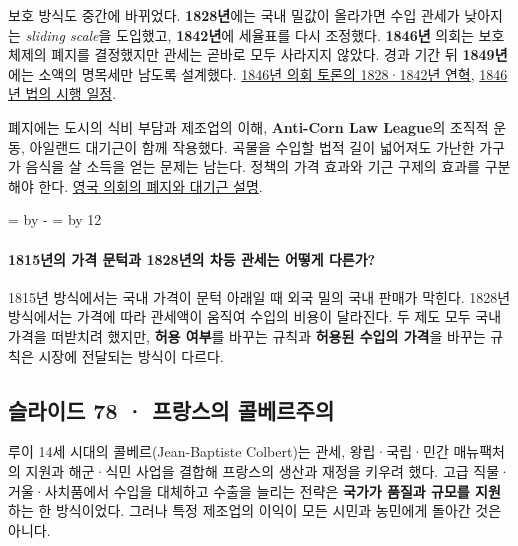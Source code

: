 \documentclass[10pt,a4paper]{article}
\newcommand{\ReserveQuestionSpace}{%
  \par\begingroup
  \dimen0=\pagegoal \advance\dimen0 by -\pagetotal
  \dimen2=\baselineskip \multiply\dimen2 by 12
  \ifdim\dimen0<\dimen2 \newpage\fi
  \endgroup}
\begin{document}
보호 방식도 중간에 바뀌었다. \textbf{1828년}에는 국내 밀값이 올라가면 수입 관세가 낮아지는 \emph{sliding scale}을 도입했고, \textbf{1842년}에 세율표를 다시 조정했다. \textbf{1846년} 의회는 보호 체제의 폐지를 결정했지만 관세는 곧바로 모두 사라지지 않았다. 경과 기간 뒤 \textbf{1849년}에는 소액의 명목세만 남도록 설계했다. \href{https://hansard.parliament.uk/commons/1846-02-26/debates/757678fd-d605-4cab-a581-8aee928e8585/CommercialPolicy\%E2\%80\%94Customs\%E2\%80\%94CornLaws\%E2\%80\%94AdjournedDedate\%E2\%80\%94\%28EleventhNight\%29}{1846년 의회 토론의 1828·1842년 연혁}, \href{https://hansard.parliament.uk/Commons/1846-03-02/debates/d792fe09-3f77-4a5f-b80c-b377fe73c3aa/TotalAndImmediateRepealOfTheCornLaws}{1846년 법의 시행 일정}.\par

폐지에는 도시의 식비 부담과 제조업의 이해, \textbf{Anti-Corn Law League}의 조직적 운동, 아일랜드 대기근이 함께 작용했다. 곡물을 수입할 법적 길이 넓어져도 가난한 가구가 음식을 살 소득을 얻는 문제는 남는다. 정책의 가격 효과와 기근 구제의 효과를 구분해야 한다. \href{https://www.parliament.uk/about/living-heritage/evolutionofparliament/legislativescrutiny/parliamentandireland/overview/the-great-famine/}{영국 의회의 폐지와 대기근 설명}.\par

\ReserveQuestionSpace
\paragraph{1815년의 가격 문턱과 1828년의 차등 관세는 어떻게 다른가?}
1815년 방식에서는 국내 가격이 문턱 아래일 때 외국 밀의 국내 판매가 막힌다. 1828년 방식에서는 가격에 따라 관세액이 움직여 수입의 비용이 달라진다. 두 제도 모두 국내 가격을 떠받치려 했지만, \textbf{허용 여부}를 바꾸는 규칙과 \textbf{허용된 수입의 가격}을 바꾸는 규칙은 시장에 전달되는 방식이 다르다.\par

\subsection{슬라이드 78 · 프랑스의 콜베르주의}
루이 14세 시대의 콜베르(Jean-Baptiste Colbert)는 관세, 왕립·국립·민간 매뉴팩처의 지원과 해군·식민 사업을 결합해 프랑스의 생산과 재정을 키우려 했다. 고급 직물·거울·사치품에서 수입을 대체하고 수출을 늘리는 전략은 \textbf{국가가 품질과 규모를 지원}하는 한 방식이었다. 그러나 특정 제조업의 이익이 모든 시민과 농민에게 돌아간 것은 아니다.\par
\end{document}

